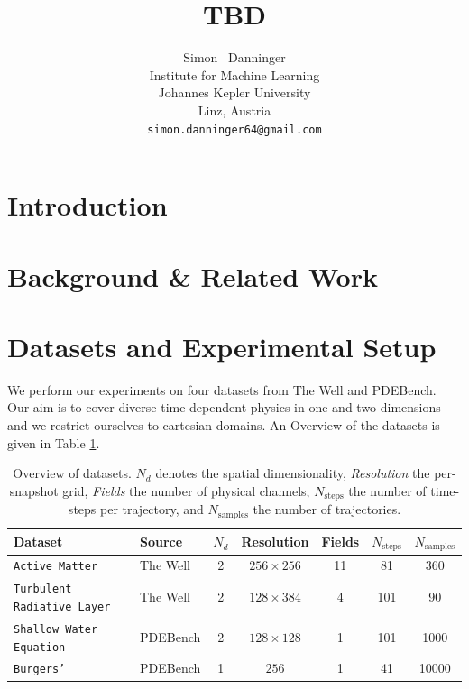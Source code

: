 \documentclass{article}
\title{TBD}
\author{%
  Simon ~Danninger\\
  Institute for Machine Learning\\
  Johannes Kepler University\\
  Linz, Austria \\
  \texttt{simon.danninger64@gmail.com} \\
}
\begin{document}
\maketitle


\begin{abstract}

\end{abstract}


\section{Introduction}




\section{Background \& Related Work}


\section{Datasets and Experimental Setup}
We perform our experiments on four datasets from The Well and PDEBench. Our aim is to cover diverse time dependent physics in one and two dimensions and we restrict ourselves to cartesian domains. An Overview of the datasets is given in Table \ref{tab:datasets}.


\begin{table}[h]
  \centering

  \begin{tabular}{llccccc}
    \toprule
    Dataset & Source & $N_d$ & Resolution & Fields & $N_\mathrm{steps}$ & $N_\mathrm{samples}$ \\
    \midrule
    \texttt{Active Matter}                  & The Well & 2 & $256\times256$ & 11 & 81  & 360   \\
    \texttt{Turbulent Radiative Layer} & The Well & 2 & $128\times384$ & 4  & 101 & 90    \\
    \texttt{Shallow Water Equation}                   & PDEBench & 2 & $128\times128$ & 1  & 101 & 1000  \\
    \texttt{Burgers'} & PDEBench & 1 & $256$          & 1  & 41  & 10000 \\
    \bottomrule
  \end{tabular}
  \vspace{0.4em}
    \caption{Overview of datasets. $N_d$ denotes the spatial dimensionality, \emph{Resolution} the per-snapshot grid, \emph{Fields} the number of physical channels, $N_\mathrm{steps}$ the number of time-steps per trajectory, and $N_\mathrm{samples}$ the number of trajectories.}
  \label{tab:datasets}
\end{table}
\end{document}

